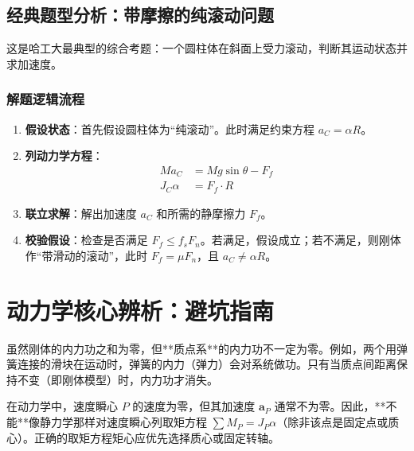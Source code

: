 \documentclass[12pt,a4paper]{article}
\newcommand{\vect}[1]{\mathbf{#1}}                   %
\begin{document}
\subsection{经典题型分析：带摩擦的纯滚动问题}

这是哈工大最典型的综合考题：一个圆柱体在斜面上受力滚动，判断其运动状态并求加速度。

\subsubsection{解题逻辑流程}
\begin{enumerate}
    \item \textbf{假设状态}：首先假设圆柱体为“纯滚动”。此时满足约束方程 $a_C = \alpha R$。
    \item \textbf{列动力学方程}：
    \begin{align}
        M a_C &= Mg \sin \theta - F_f \\
        J_C \alpha &= F_f \cdot R
    \end{align}
    \item \textbf{联立求解}：解出加速度 $a_C$ 和所需的静摩擦力 $F_f$。
    \item \textbf{校验假设}：检查是否满足 $F_f \leq f_s F_n$。若满足，假设成立；若不满足，则刚体作“带滑动的滚动”，此时 $F_f = \mu F_n$，且 $a_C \neq \alpha R$。
\end{enumerate}

\section{动力学核心辨析：避坑指南}

\begin{tcolorbox}[colback=orange!5!white, colframe=orange!75!black, title=辨析 01：内力做功问题]
    虽然刚体的内力功之和为零，但**质点系**的内力功不一定为零。例如，两个用弹簧连接的滑块在运动时，弹簧的内力（弹力）会对系统做功。只有当质点间距离保持不变（即刚体模型）时，内力功才消失。
\end{tcolorbox}

\begin{tcolorbox}[colback=red!5!white, colframe=red!75!black, title=辨析 02：瞬心的加速度]
    在动力学中，速度瞬心 $P$ 的速度为零，但其加速度 $\vect{a}_P$ 通常不为零。因此，**不能**像静力学那样对速度瞬心列取矩方程 $\sum M_P = J_P \alpha$（除非该点是固定点或质心）。正确的取矩方程矩心应优先选择质心或固定转轴。
\end{tcolorbox}
\end{document}
